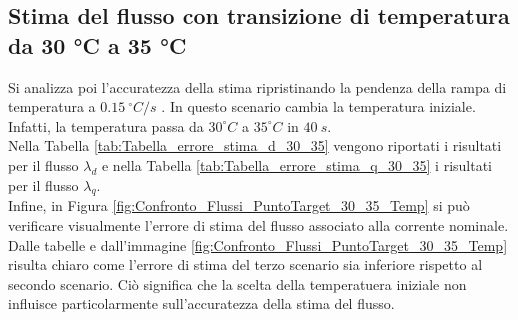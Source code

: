 \subsection{Stima del flusso con transizione di temperatura da 30 °C a 35 °C}
Si analizza poi l'accuratezza della stima ripristinando la pendenza della rampa di temperatura a $0.15\ ^\circ C/s$ . In questo scenario cambia la temperatura iniziale. Infatti, la temperatura passa da $30 ^\circ C$ a $35 ^\circ C$ in $40 \ s$. \\
Nella Tabella \ref{tab:Tabella_errore_stima_d_30_35} vengono riportati i risultati per il flusso $\lambda_d$ e nella Tabella \ref{tab:Tabella_errore_stima_q_30_35} i risultati per il flusso $\lambda_q$.\\
Infine, in Figura \ref{fig:Confronto_Flussi_PuntoTarget_30_35_Temp} si può verificare visualmente l'errore di stima del flusso associato alla corrente nominale.
Dalle tabelle e dall'immagine \ref{fig:Confronto_Flussi_PuntoTarget_30_35_Temp} risulta chiaro come l'errore di stima del terzo scenario sia inferiore rispetto al secondo scenario. Ciò significa che la scelta della temperatuera iniziale non influisce particolarmente sull'accuratezza della stima del flusso.





